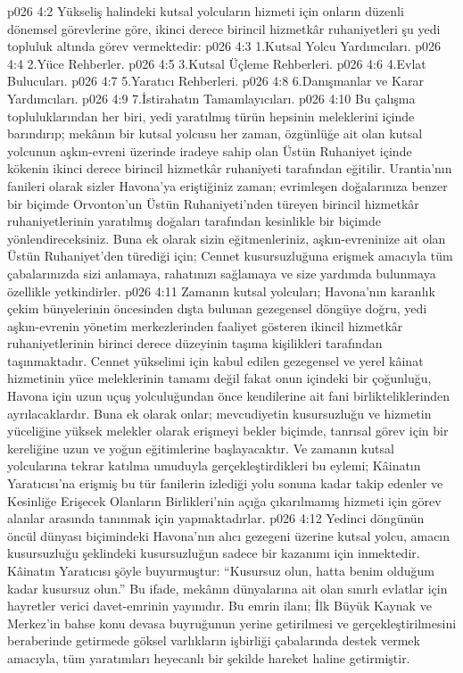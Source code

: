 \vs p026 4:2 Yükseliş halindeki kutsal yolcuların hizmeti için onların düzenli dönemsel görevlerine göre, ikinci derece birincil hizmetkâr ruhaniyetleri şu yedi topluluk altında görev vermektedir:
\vs p026 4:3 1.\bibnobreakspace Kutsal Yolcu Yardımcıları.
\vs p026 4:4 2.\bibnobreakspace Yüce Rehberler.
\vs p026 4:5 3.\bibnobreakspace Kutsal Üçleme Rehberleri.
\vs p026 4:6 4.\bibnobreakspace Evlat Bulucuları.
\vs p026 4:7 5.\bibnobreakspace Yaratıcı Rehberleri.
\vs p026 4:8 6.\bibnobreakspace Danışmanlar ve Karar Yardımcıları.
\vs p026 4:9 7.\bibnobreakspace İstirahatın Tamamlayıcıları.
\vs p026 4:10 Bu çalışma topluluklarından her biri, yedi yaratılmış türün hepsinin meleklerini içinde barındırıp; mekânın bir kutsal yolcusu her zaman, özgünlüğe ait olan kutsal yolcunun aşkın\hyp{}evreni üzerinde iradeye sahip olan Üstün Ruhaniyet içinde kökenin ikinci derece birincil hizmetkâr ruhaniyeti tarafından eğitilir. Urantia’nın fanileri olarak sizler Havona’ya eriştiğiniz zaman; evrimleşen doğalarınıza benzer bir biçimde Orvonton’un Üstün Ruhaniyeti’nden türeyen birincil hizmetkâr ruhaniyetlerinin yaratılmış doğaları tarafından kesinlikle bir biçimde yönlendireceksiniz. Buna ek olarak sizin eğitmenleriniz, aşkın\hyp{}evreninize ait olan Üstün Ruhaniyet’den türediği için; Cennet kusursuzluğuna erişmek amacıyla tüm çabalarınızda sizi anlamaya, rahatınızı sağlamaya ve size yardımda bulunmaya özellikle yetkindirler.
\vs p026 4:11 Zamanın kutsal yolcuları; Havona’nın karanlık çekim bünyelerinin öncesinden dışta bulunan gezegensel döngüye doğru, yedi aşkın\hyp{}evrenin yönetim merkezlerinden faaliyet gösteren ikincil hizmetkâr ruhaniyetlerinin birinci derece düzeyinin taşıma kişilikleri tarafından taşınmaktadır. Cennet yükselimi için kabul edilen gezegensel ve yerel kâinat hizmetinin yüce meleklerinin tamamı değil fakat onun içindeki bir çoğunluğu, Havona için uzun uçuş yolculuğundan önce kendilerine ait fani birlikteliklerinden ayrılacaklardır. Buna ek olarak onlar; mevcudiyetin kusursuzluğu ve hizmetin yüceliğine yüksek melekler olarak erişmeyi bekler biçimde, tanrısal görev için bir kereliğine uzun ve yoğun eğitimlerine başlayacaktır. Ve zamanın kutsal yolcularına tekrar katılma umuduyla gerçekleştirdikleri bu eylemi; Kâinatın Yaratıcısı’na erişmiş bu tür fanilerin izlediği yolu sonuna kadar takip edenler ve Kesinliğe Erişecek Olanların Birlikleri’nin açığa çıkarılmamış hizmeti için görev alanlar arasında tanınmak için yapmaktadırlar.
\vs p026 4:12 Yedinci döngünün öncül dünyası biçimindeki Havona’nın alıcı gezegeni üzerine kutsal yolcu, amacın kusursuzluğu şeklindeki kusursuzluğun sadece bir kazanımı için inmektedir. Kâinatın Yaratıcısı şöyle buyurmuştur: “Kusursuz olun, hatta benim olduğum kadar kusursuz olun.” Bu ifade, mekânın dünyalarına ait olan sınırlı evlatlar için hayretler verici davet\hyp{}emrinin yayınıdır. Bu emrin ilanı; İlk Büyük Kaynak ve Merkez’in bahse konu devasa buyruğunun yerine getirilmesi ve gerçekleştirilmesini beraberinde getirmede göksel varlıkların işbirliği çabalarında destek vermek amacıyla, tüm yaratımları heyecanlı bir şekilde hareket haline getirmiştir.
